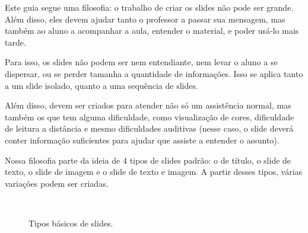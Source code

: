 Este guia segue uma filosofia: o trabalho de criar os slides não pode ser grande. Além disso, eles devem ajudar tanto o professor a passar sua mensagem, mas também ao aluno a acompanhar a aula, entender o material, e poder usá-lo mais tarde.

Para isso, os slides não podem ser nem entendiante, nem levar o aluno a se dispersar, ou se perder tamanha a quantidade de informações. Isso se aplica tanto a um slide isolado, quanto a uma sequência de slides.

Além disso, devem ser criados para atender não só um assistência normal, mas também os que tem alguma dificuldade, como visualização de cores, dificuldade de leitura a distância e mesmo dificuldades auditivas (nesse caso, o slide deverá conter informação suficientes para ajudar que assiste a entender o assunto).

Nossa filosofia parte da ideia de 4 tipos de slides padrão: o de título, o slide de texto, o slide de imagem e o slide de texto e imagem. A partir desses tipos, várias variações podem ser criadas.

\begin{figure}[hbt]
    \centering
    \\
    \caption{Tipos básicos de slides.}
    \label{fig:tiposbasicos}
\end{figure}

